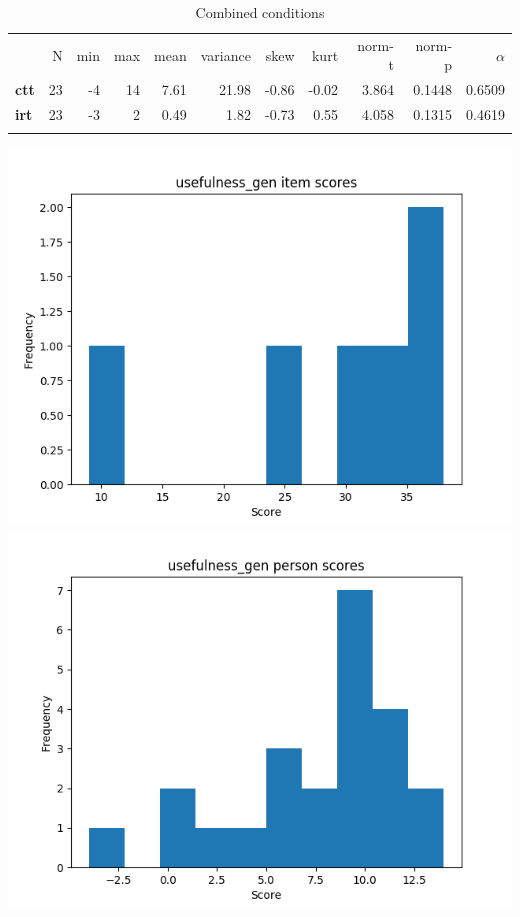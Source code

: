 \begin{longtable}[c]{@{}lrrrrrrrrrr@{}}
\caption{Combined conditions}
\endfirsthead
\toprule\addlinespace
& N & min & max & mean & variance & skew & kurt & norm-t &
norm-p & $\alpha$
\\\addlinespace
\midrule
\textbf{ctt} & 23 & -4 & 14 & 7.61 & 21.98 & -0.86 & -0.02 & 3.864 &
0.1448 & 0.6509
\\\addlinespace
\textbf{irt} & 23 & -3 & 2 & 0.49 & 1.82 & -0.73 & 0.55 & 4.058 & 0.1315
& 0.4619
\\\addlinespace
\bottomrule
\end{longtable}

\includegraphics[width=\textwidth]{img/usefulness_gen_diff.png}
\includegraphics[width=\textwidth]{img/usefulness_gen_abil.png}

